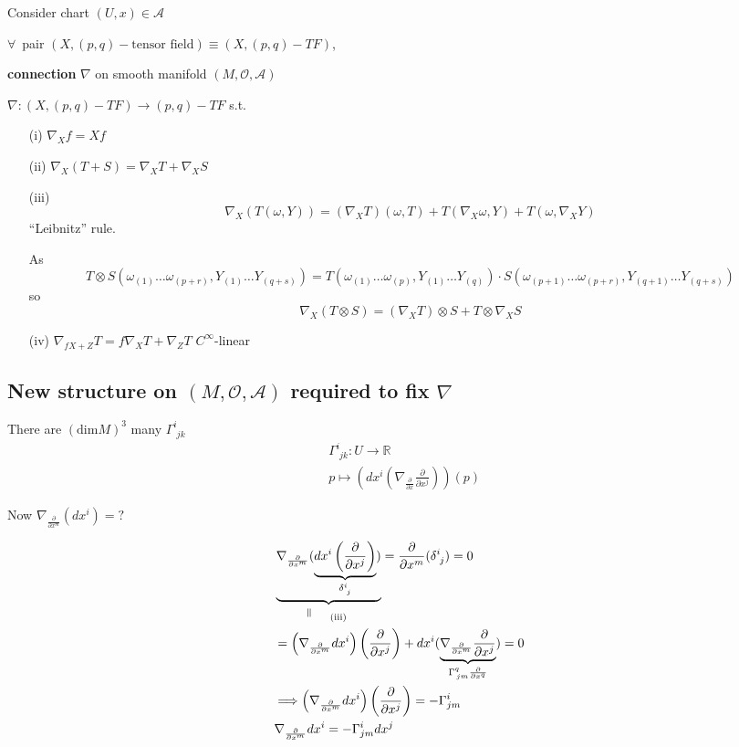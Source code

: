 Consider chart $(U,x) \in \mathcal{A}$

\begin{definition}
$\forall \, $ pair $(X, (p,q)-\text{tensor field}) \equiv (X, (p,q)-TF)$,

\textbf{connection} $\nabla$ on smooth manifold $(M,\mathcal{O},\mathcal{A})$ 

$\nabla: ( X, (p,q)-TF) \to (p,q)-TF$ s.t.

\begin{enumerate}
  \item[(i)] $\nabla_X f = Xf $
  \item[(ii)]  $\nabla_X(T+S) = \nabla_XT + \nabla_XS $ 
\item[(iii)] \[
\nabla_X(T(\omega,Y)) = (\nabla_XT)(\omega,T) + T(\nabla_X\omega, Y) + T(\omega, \nabla_XY)
\]
``Leibnitz'' rule.

As
\[
T\otimes S (\omega_{(1)}\dots \omega_{(p+r)} , Y_{(1)} \dots Y_{(q+s)}) = T(\omega_{(1)} \dots \omega_{(p)}, Y_{(1)} \dots Y_{(q)} ) \cdot S( \omega_{(p+1)} \dots \omega_{(p+r)} , Y_{(q+1)} \dots Y_{(q+s)})
\]
so 
\[
\nabla_X(T\otimes S) = (\nabla_XT)\otimes S + T\otimes \nabla_XS
\]


\item[(iv)] $\nabla_{fX+Z} T = f\nabla_X T + \nabla_Z T$
$C^{\infty}$-linear
\end{enumerate}
\end{definition}

\subsection{New structure on $(M,\mathcal{O},\mathcal{A})$ required to fix $\nabla$}


There are $(\text{dim}M)^3$ many $\Gamma^i_{ \, \, j k}$
\[
\begin{aligned}
&  \Gamma^i_{ \, \, jk} : U \to \mathbb{R} \\ 
&  p \mapsto \left( dx^i ( \nabla_{ \frac{ \partial}{ \partial x} } \frac{ \partial }{ \partial x^j } ) \right)(p)
\end{aligned}
\]

Now $\nabla_{ \frac{ \partial }{ \partial x^m}  }(dx^i) = ?$

\[
\begin{aligned}
  & \underbrace{ \nabla_{  \frac{ \partial }{ \partial x^m} } ( \underbrace{ dx^i \left( \frac{ \partial }{ \partial x^j } \right) }_{ \delta^i_{ \, \, j} } ) }_{ \rotatebox{90}{$\,=$} \quad \, \text{ (iii) } }  = \frac{ \partial }{ \partial x^m} ( \delta^i_{ \, \, j} ) = 0  \\
& = \left( \nabla_{ \frac{ \partial }{ \partial x^m} } dx^i \right)\left( \frac{ \partial }{ \partial x^j} \right) + dx^i (   \underbrace{ \nabla_{ \frac{ \partial }{ \partial x^m } } \frac{ \partial }{ \partial x^j } }_{ \Gamma^q_{ \, jm }\frac{ \partial }{ \partial x^q} }   ) = 0 \\
& \Longrightarrow \left( \nabla_{ \frac{ \partial }{ \partial x^m } } dx^i \right)\left( \frac{ \partial }{ \partial x^j } \right) = - \Gamma^i_{ jm} \\
& \nabla_{ \frac{ \partial }{ \partial x^m} } dx^i = -\Gamma^i_{ jm} dx^j 
\end{aligned}
\]


